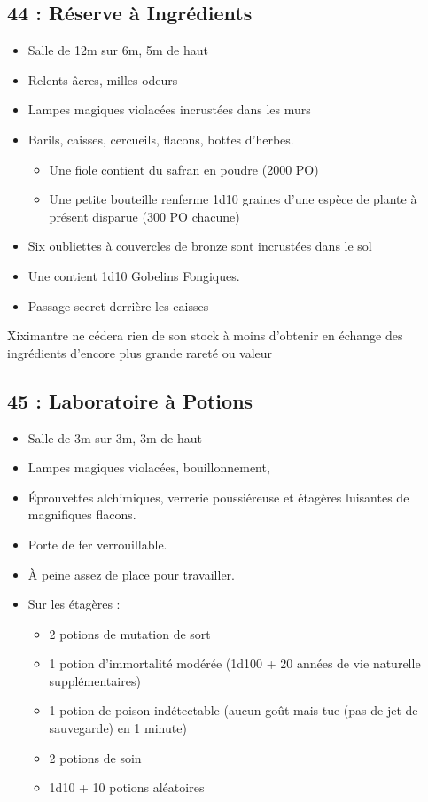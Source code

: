 \subsection{44 : Réserve à Ingrédients}\label{n3:s44}
\begin{itemize}
  \item Salle de 12m sur 6m, 5m de haut
  \item Relents âcres, milles odeurs
  \item Lampes magiques violacées incrustées dans les murs
  \item Barils, caisses, cercueils, flacons, bottes d'herbes.
  \begin{itemize}
    \item Une fiole contient du safran en poudre (2000 PO)
    \item Une petite bouteille renferme  1d10 graines d'une espèce de plante à présent disparue (300 PO chacune)
  \end{itemize}
  \item Six oubliettes à couvercles de bronze sont incrustées dans le sol
  \item Une contient  1d10 Gobelins Fongiques.
  \item Passage secret derrière les caisses
\end{itemize}

Xiximantre ne cédera rien de son stock à moins d'obtenir en échange des ingrédients d'encore plus grande rareté ou valeur

\vfill

\subsection{45 : Laboratoire à Potions}\label{n3:s45}
\begin{itemize}
  \item Salle de 3m sur 3m, 3m de haut
  \item Lampes magiques violacées, bouillonnement,
  \item Éprouvettes alchimiques, verrerie poussiéreuse et étagères luisantes de magnifiques flacons.
  \item Porte de fer verrouillable.
  \item À peine assez de place pour travailler.
  \item Sur les étagères :
  \begin{itemize}
    \item 2 potions de mutation de sort
    \item 1 potion d'immortalité modérée (1d100 + 20 années de vie naturelle supplémentaires)
    \item 1 potion de poison indétectable (aucun goût mais tue (pas de jet de sauvegarde) en 1 minute)
    \item 2 potions de soin
    \item 1d10 + 10 potions aléatoires
  \end{itemize}
\end{itemize}

